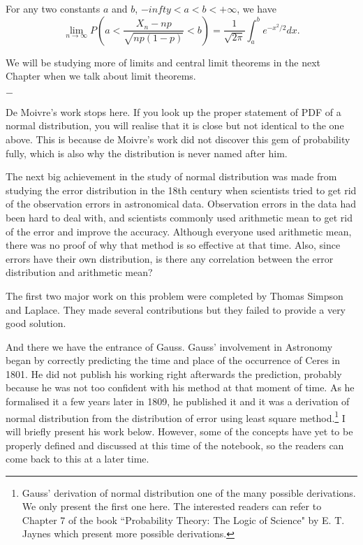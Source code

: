 \documentclass[11pt, a4paper, oneside]{book}
\theoremstyle{definition}
\newcommand{\breaking}{%
    \begin{center}
    $-$
    \end{center}%
}
\begin{document}
\noindent For any two constants $a$ and $b$, $-infty < a < b< +\infty$, we have\[
\lim_{n \to \infty} P(a < \frac{X_n - np}{\sqrt{np(1-p)}} < b) = \frac{1}{\sqrt{2\pi}} \int_a^b e^{-x^2 /2} dx.
\]

\noindent We will be studying more of limits and central limit theorems in the next Chapter when we talk about limit theorems. 

\breaking

\noindent De Moivre's work stops here. If you look up the proper statement of PDF of a normal distribution, you will realise that it is close but not identical to the one above. This is because de Moivre's work did not discover this gem of probability fully, which is also why the distribution is never named after him.

\noindent The next big achievement in the study of normal distribution was made from studying the error distribution in the 18th century when scientists tried to get rid of the observation errors in astronomical data. Observation errors in the data had been hard to deal with, and scientists commonly used arithmetic mean to get rid of the error and improve the accuracy. Although everyone used arithmetic mean, there was no proof of why that method is so effective at that time. Also, since errors have their own distribution, is there any correlation between the error distribution and arithmetic mean? 

\noindent The first two major work on this problem were completed by Thomas Simpson and Laplace. They made several contributions but they failed to provide a very good solution. 

\noindent And there we have the entrance of Gauss. Gauss' involvement in Astronomy began by correctly predicting the time and place of the occurrence of Ceres in 1801. He did not publish his working right afterwards the prediction, probably because he was not too confident with his method at that moment of time. As he formalised it a few years later in 1809, he published it and it was a derivation of normal distribution from the distribution of error using least square method.\footnote{Gauss' derivation of normal distribution one of the many possible derivations. We only present the first one here. The interested readers can refer to Chapter 7 of the book ``Probability Theory: The Logic of Science" by E. T. Jaynes which present more possible derivations.} I will briefly present his work below. However, some of the concepts have yet to be properly defined and discussed at this time of the notebook, so the readers can come back to this at a later time.
\end{document}
